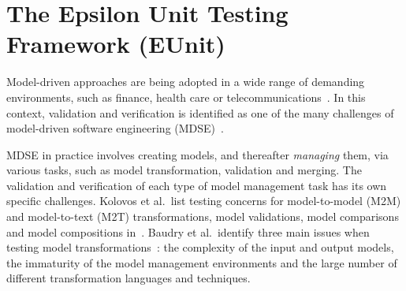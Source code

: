 \clearpage
\chapter{The Epsilon Unit Testing Framework (EUnit)}
\label{chp:eunit}

Model-driven approaches are being adopted in a wide range of demanding environments, such as finance, health care or telecommunications~\cite{Guttman2006}. In this context, validation and verification is identified as one of the many challenges of model-driven software engineering (MDSE)~\cite{Chaudron2009}.

MDSE in practice involves creating models, and thereafter \textit{managing} them, via various tasks, such as model transformation, validation and merging.  The validation and verification of each type of model management task has its own specific challenges. Kolovos et al.\ list testing concerns for model-to-model (M2M) and model-to-text (M2T) transformations, model validations, model comparisons and model compositions in~\cite{EUnit}. Baudry et al.\ identify three main issues when testing model transformations~\cite{Baudry2010}: the complexity of the input and output models, the immaturity of the model management environments and the large number of different transformation languages and techniques.

